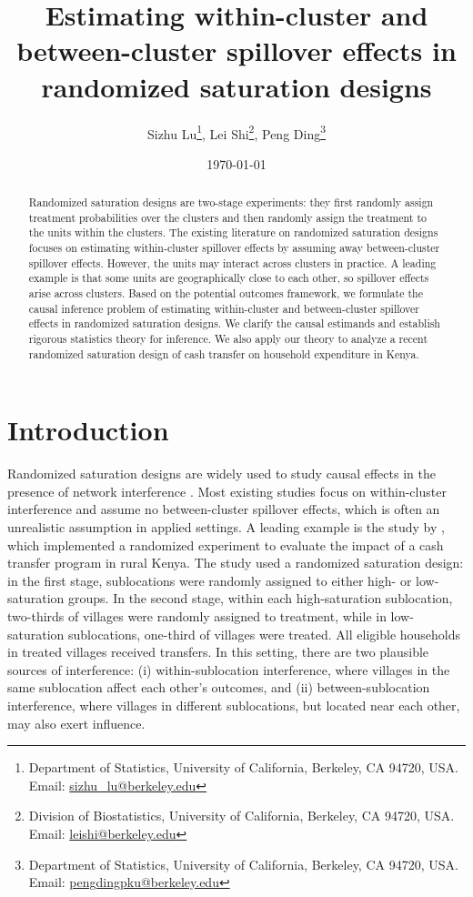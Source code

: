 \documentclass{article}
\title{Estimating within-cluster and between-cluster spillover effects in randomized saturation designs}
\author{ 
Sizhu Lu\thanks{Department of Statistics, University of California, Berkeley, CA 94720, USA. Email: \href{mailto:sizhu_lu@berkeley.edu}{sizhu\_lu@berkeley.edu}}, 
Lei Shi\thanks{Division of Biostatistics, University of California, Berkeley, CA 94720, USA. Email: \href{mailto:leishi@berkeley.edu}{leishi@berkeley.edu}}, 
Peng Ding\thanks{Department of Statistics, University of California, Berkeley, CA 94720, USA. Email: \href{mailto:pengdingpku@berkeley.edu}{pengdingpku@berkeley.edu}}
}
\date{\today}
\begin{document}
\maketitle
\begin{abstract}
    Randomized saturation designs are two-stage experiments: they first randomly assign treatment probabilities over the clusters and then randomly assign the treatment to the units within the clusters. The existing literature on randomized saturation designs focuses on estimating within-cluster spillover effects by assuming away between-cluster spillover effects. However, the units may interact across clusters in practice. A leading example is that some units are geographically close to each other, so spillover effects arise across clusters. Based on the potential outcomes framework, we formulate the causal inference problem of estimating within-cluster and between-cluster spillover effects in randomized saturation designs. We clarify the causal estimands and establish rigorous statistics theory for inference. We also apply our theory to analyze a recent randomized saturation design of cash transfer on household expenditure in Kenya.
\end{abstract}


\section{Introduction}
Randomized saturation designs are widely used to study causal effects in the presence of network interference \citep{hudgens2008toward}. Most existing studies focus on within-cluster interference and assume no between-cluster spillover effects, which is often an unrealistic assumption in applied settings. A leading example is the study by \citet{egger2022general}, which implemented a randomized experiment to evaluate the impact of a cash transfer program in rural Kenya. The study used a randomized saturation design: in the first stage, sublocations were randomly assigned to either high- or low-saturation groups. In the second stage, within each high-saturation sublocation, two-thirds of villages were randomly assigned to treatment, while in low-saturation sublocations, one-third of villages were treated. All eligible households in treated villages received transfers. In this setting, there are two plausible sources of interference: (i) within-sublocation interference, where villages in the same sublocation affect each other’s outcomes, and (ii) between-sublocation interference, where villages in different sublocations, but located near each other, may also exert influence.
\end{document}
